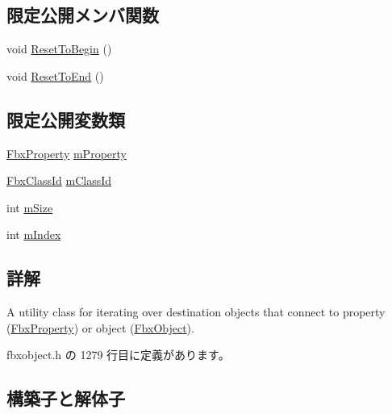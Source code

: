 \subsection*{限定公開メンバ関数}
\begin{DoxyCompactItemize}
\item 
void \hyperlink{class_fbx_iterator_dst_base_aa732906f31b3b79c5380186d02cb7159}{Reset\+To\+Begin} ()
\item 
void \hyperlink{class_fbx_iterator_dst_base_ab742852e3955c14f6299f6104120c2d2}{Reset\+To\+End} ()
\end{DoxyCompactItemize}
\subsection*{限定公開変数類}
\begin{DoxyCompactItemize}
\item 
\hyperlink{class_fbx_property}{Fbx\+Property} \hyperlink{class_fbx_iterator_dst_base_a3f4bd3e4d6427c2183c2fae3c3cc3033}{m\+Property}
\item 
\hyperlink{class_fbx_class_id}{Fbx\+Class\+Id} \hyperlink{class_fbx_iterator_dst_base_a6de7e7773a295d5cd2cf5e1dbb1e355a}{m\+Class\+Id}
\item 
int \hyperlink{class_fbx_iterator_dst_base_a9bac54bd7497f350e9a7f8be88d711eb}{m\+Size}
\item 
int \hyperlink{class_fbx_iterator_dst_base_ad24255785c3869f0c76d37aa4cedf6aa}{m\+Index}
\end{DoxyCompactItemize}


\subsection{詳解}
A utility class for iterating over destination objects that connect to property (\hyperlink{class_fbx_property}{Fbx\+Property}) or object (\hyperlink{class_fbx_object}{Fbx\+Object}). 

 fbxobject.\+h の 1279 行目に定義があります。



\subsection{構築子と解体子}
\mbox{\label{class_fbx_iterator_dst_base_ab8ebd364825476724f9db0ca76bf6f9b}} 
